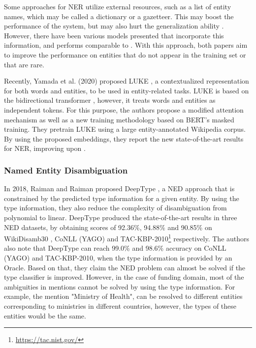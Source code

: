 \documentclass{article}
\theoremstyle{definition}
\theoremstyle{remark}
\begin{document}
Some approaches for NER utilize external resources, such as a list of entity names, which may be called a dictionary or a gazetteer. This may boost the performance of the system, but may also hurt the generalization ability \cite{NERsurvey}. However, there have been various models presented \cite{NERgazetteer, NERDict} that incorporate this information, and performs comparable to \cite{flairpaper}. With this approach, both papers \cite{NERgazetteer, NERDict} aim to improve the performance on entities that do not appear in the training set or that are rare. 

Recently, Yamada et al. (2020) proposed LUKE \cite{LUKE}, a contextualized representation for both words and entities, to be used in entity-related tasks. LUKE is based on the bidirectional transformer \cite{transformer}, however, it treats words and entities as independent tokens. For this purpose, the authors propose a modified attention mechanism as well as a new training methodology based on BERT's \cite{BERT} masked training. They pretrain LUKE using a large entity-annotated Wikipedia corpus. By using the proposed embeddings, they report the new state-of-the-art results for NER, improving upon \cite{flairpaper}. 

\subsubsection{Named Entity Disambiguation}

In 2018, Raiman and Raiman proposed DeepType \cite{raiman}, a NED approach that is constrained by the predicted type information for a given entity. By using the type information, they also reduce the complexity of disambiguation from polynomial to linear. DeepType produced the state-of-the-art results in three NED datasets, by obtaining scores of 92.36\%, 94.88\% and 90.85\% on WikiDisamb30 \cite{wikidisamb}, CoNLL (YAGO) \cite{CoNLLYago} and TAC-KBP-2010\footnote{\url{https://tac.nist.gov/}} respectively. The authors also note that DeepType can reach 99.0\% and 98.6\% accuracy on CoNLL (YAGO) and TAC-KBP-2010, when the type information is provided by an Oracle. Based on that, they claim the NED problem can almost be solved if the type classifier is improved.  However, in the case of funding domain, most of the ambiguities in mentions cannot be solved by using the type information. For example, the mention "Ministry of Health", can be resolved to different entities corresponding to ministries in different countries, however,  the types of these entities would be the same.
\end{document}
